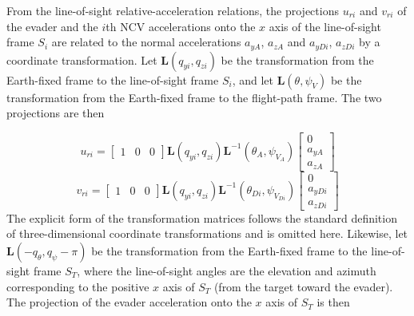 From the line-of-sight relative-acceleration relations, the projections ${u_{ri}}$ and ${v_{ri}}$ of the evader and the $i$th NCV accelerations onto the $x$ axis of the line-of-sight frame ${S_i}$ are related to the normal accelerations ${a_{yA}}$, ${a_{zA}}$ and ${a_{yDi}}$, ${a_{zDi}}$ by a coordinate transformation. Let ${\mathbf{L}}({q_{yi}},{q_{zi}})$ be the transformation from the Earth-fixed frame to the line-of-sight frame ${S_i}$, and let ${\mathbf{L}}(\theta ,{\psi _V})$ be the transformation from the Earth-fixed frame to the flight-path frame. The two projections are then

\begin{equation}
\label{eq:6}
{u_{ri}} = \left[ {\begin{array}{*{20}{c}}
  1&0&0 
\end{array}} \right]{\mathbf{L}}({q_{yi}},{q_{zi}}){{\mathbf{L}}^{ - 1}}({\theta _A},{\psi _{{V_A}}})\left[ {\begin{array}{*{20}{c}}
  0 \\ 
  {{a_{yA}}} \\ 
  {{a_{zA}}} 
\end{array}} \right]
\end{equation}
\begin{equation}
\label{eq:7}
{v_{ri}} = \left[ {\begin{array}{*{20}{c}}
  1&0&0 
\end{array}} \right]{\mathbf{L}}({q_{yi}},{q_{zi}}){{\mathbf{L}}^{ - 1}}({\theta _{Di}},{\psi _{{V_{Di}}}})\left[ {\begin{array}{*{20}{c}}
  0 \\ 
  {{a_{yDi}}} \\ 
  {{a_{zDi}}} 
\end{array}} \right]
\end{equation}
The explicit form of the transformation matrices follows the standard definition of three-dimensional coordinate transformations and is omitted here. Likewise, let ${\mathbf{L}}( - {q_\theta },{q_\psi } - \pi )$ be the transformation from the Earth-fixed frame to the line-of-sight frame ${S_T}$, where the line-of-sight angles are the elevation and azimuth corresponding to the positive $x$ axis of ${S_T}$ (from the target toward the evader). The projection of the evader acceleration onto the $x$ axis of ${S_T}$ is then

